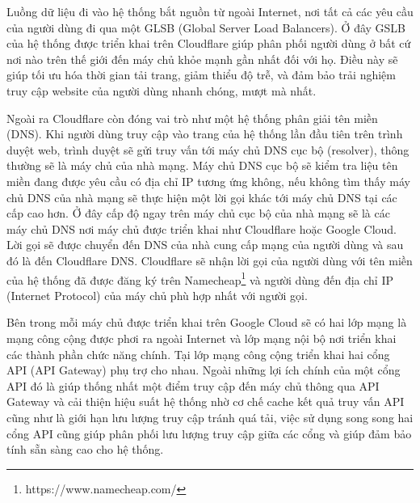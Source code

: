 Luồng dữ liệu đi vào hệ thống bắt nguồn từ ngoài Internet, nơi tất cả các yêu cầu của người dùng đi qua một GLSB (Global Server Load Balancers).
Ở đây GSLB của hệ thống được triển khai trên Cloudflare giúp phân phối người dùng ở bất cứ nơi nào trên thế giới đến máy chủ khỏe mạnh gần nhất đối với họ.
Điều này sẽ giúp tối ưu hóa thời gian tải trang, giảm thiểu độ trễ, và đảm bảo trải nghiệm truy cập website của người dùng nhanh chóng, mượt mà nhất.

Ngoài ra Cloudflare còn đóng vai trò như một hệ thống phân giải tên miền (DNS).
Khi người dùng truy cập vào trang của hệ thống lần đầu tiên trên trình duyệt web, trình duyệt sẽ gửi truy vấn tới máy chủ DNS cục bộ (resolver), thông thường sẽ là máy chủ của nhà mạng.
Máy chủ DNS cục bộ sẽ kiểm tra liệu tên miền đang được yêu cầu có địa chỉ IP tương ứng không, nếu không tìm thấy máy chủ DNS của nhà mạng sẽ thực hiện một lời gọi khác tới máy chủ DNS tại các cấp cao hơn.
Ở đây cấp độ ngay trên máy chủ cục bộ của nhà mạng sẽ là các máy chủ DNS nơi máy chủ được triển khai như Cloudflare hoặc Google Cloud.
Lời gọi sẽ được chuyển đến DNS của nhà cung cấp mạng của người dùng và sau đó là đến Cloudflare DNS.
Cloudflare sẽ nhận lời gọi của người dùng với tên miền của hệ thống đã được đăng ký trên Namecheap\footnote{https://www.namecheap.com/} và người dùng đến địa chỉ IP (Internet Protocol) của máy chủ phù hợp nhất với người gọi.

Bên trong mỗi máy chủ được triển khai trên Google Cloud sẽ có hai lớp mạng là mạng công cộng được phơi ra ngoài Internet và lớp mạng nội bộ nơi triển khai các thành phần chức năng chính.
Tại lớp mạng công cộng triển khai hai cổng API (API Gateway) phụ trợ cho nhau.
Ngoài những lợi ích chính của một cổng API đó là giúp thống nhất một điểm truy cập đến máy chủ thông qua API Gateway và cải thiện hiệu suất hệ thống nhờ cơ chế cache kết quả truy vấn API cũng như là giới hạn lưu lượng truy cập tránh quá tải, việc sử dụng song song hai cổng API cũng giúp phân phối lưu lượng truy cập giữa các cổng và giúp đảm bảo tính sẵn sàng cao cho hệ thống.

